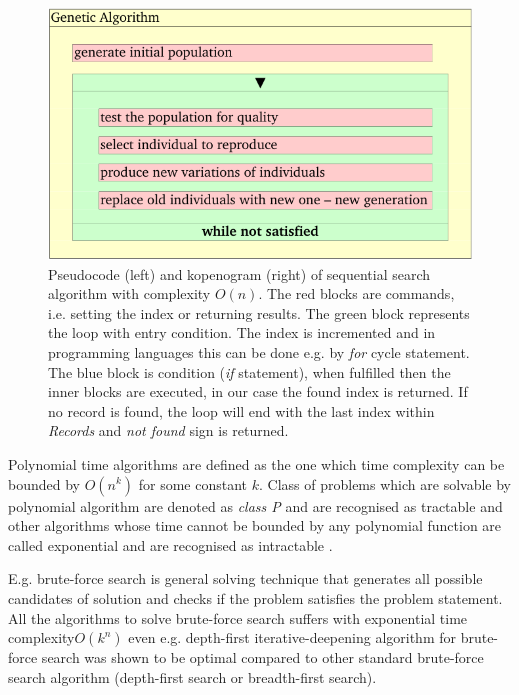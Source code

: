 \begin{figure}[ht]
    \centering
    \includegraphics[page=3]{chapter3/GA-kopenogram-crop.pdf}    
    \caption{Pseudocode (left) and kopenogram (right) of sequential search algorithm with complexity $O(n)$. The red blocks are commands, i.e. setting the index or returning results. The green block represents the loop with entry condition. The index is incremented and in programming languages this can be done e.g. by \emph{for} cycle statement. The blue block is condition (\emph{if} statement), when fulfilled then the inner blocks are executed, in our case the found index is returned. If no record is found, the loop will end with the last index within \emph{Records} and \emph{not found} sign is returned. }
    \label{fig:search}
\end{figure}

Polynomial time algorithms are defined as the one which time complexity can be bounded by $O(n^k)$ for some constant $k$. Class of problems which are solvable by polynomial algorithm are denoted as \emph{class P} and are recognised as tractable\cite{Cobham1964,Cook1983} and other algorithms whose time cannot be bounded by any polynomial function are called exponential and are recognised as intractable \cite{Garey1979,Cook1983}. 

E.g. brute-force search is general solving technique that generates all possible candidates of solution and checks if the problem satisfies the problem statement. All the algorithms to solve brute-force search suffers with exponential time complexity$O(k^n)$ even e.g. depth-first iterative-deepening algorithm for brute-force search was shown to be optimal compared to other standard brute-force search algorithm (depth-first search or breadth-first search)\cite{Korf1985,Pearl1987}.

